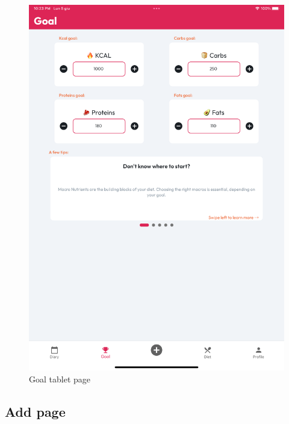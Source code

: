 \documentclass{Configuration_Files/PoliMi3i_thesis}
\begin{document}
\begin{figure}[!h]
  \includegraphics[scale=0.1]{Images/Screenshots/Tablet/GoalTabletLight.png}
  \caption{Goal tablet page}
\end{figure}

\clearpage

\subsection{Add page}
\end{document}

